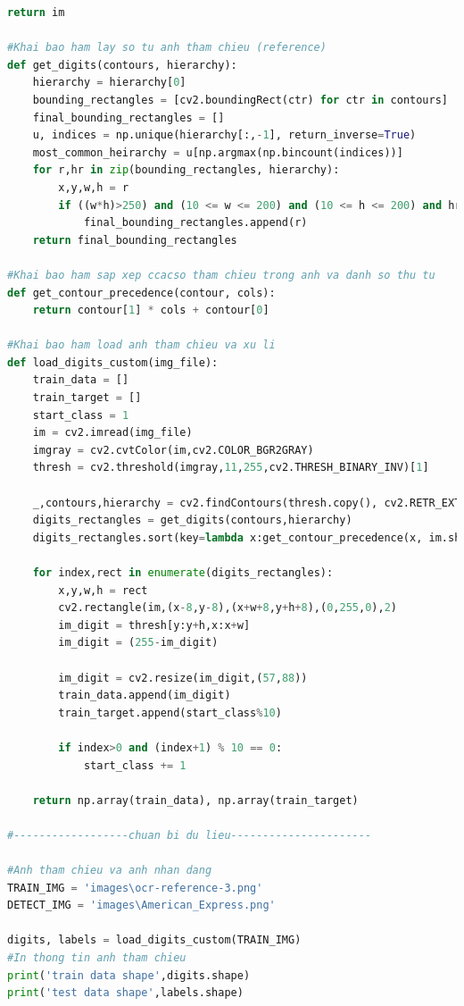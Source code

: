 \begin{lstlisting}[language=Python, caption=Recognition American Express]
    return im

#Khai bao ham lay so tu anh tham chieu (reference)
def get_digits(contours, hierarchy):
    hierarchy = hierarchy[0]
    bounding_rectangles = [cv2.boundingRect(ctr) for ctr in contours]   
    final_bounding_rectangles = []
    u, indices = np.unique(hierarchy[:,-1], return_inverse=True)
    most_common_heirarchy = u[np.argmax(np.bincount(indices))]
    for r,hr in zip(bounding_rectangles, hierarchy):
        x,y,w,h = r
        if ((w*h)>250) and (10 <= w <= 200) and (10 <= h <= 200) and hr[3] == most_common_heirarchy: 
            final_bounding_rectangles.append(r)    
    return final_bounding_rectangles

#Khai bao ham sap xep ccacso tham chieu trong anh va danh so thu tu
def get_contour_precedence(contour, cols):
    return contour[1] * cols + contour[0]

#Khai bao ham load anh tham chieu va xu li
def load_digits_custom(img_file):
    train_data = []
    train_target = []
    start_class = 1
    im = cv2.imread(img_file)
    imgray = cv2.cvtColor(im,cv2.COLOR_BGR2GRAY)
    thresh = cv2.threshold(imgray,11,255,cv2.THRESH_BINARY_INV)[1]   
       
    _,contours,hierarchy = cv2.findContours(thresh.copy(), cv2.RETR_EXTERNAL, cv2.CHAIN_APPROX_SIMPLE)
    digits_rectangles = get_digits(contours,hierarchy)  
    digits_rectangles.sort(key=lambda x:get_contour_precedence(x, im.shape[1]))
     
    for index,rect in enumerate(digits_rectangles):
        x,y,w,h = rect
        cv2.rectangle(im,(x-8,y-8),(x+w+8,y+h+8),(0,255,0),2)
        im_digit = thresh[y:y+h,x:x+w]
        im_digit = (255-im_digit)
        
        im_digit = cv2.resize(im_digit,(57,88))
        train_data.append(im_digit)
        train_target.append(start_class%10)

        if index>0 and (index+1) % 10 == 0:
            start_class += 1
    
    return np.array(train_data), np.array(train_target)

#------------------chuan bi du lieu----------------------

#Anh tham chieu va anh nhan dang
TRAIN_IMG = 'images\ocr-reference-3.png'
DETECT_IMG = 'images\American_Express.png'

digits, labels = load_digits_custom(TRAIN_IMG)
#In thong tin anh tham chieu
print('train data shape',digits.shape)
print('test data shape',labels.shape)


\end{lstlisting}
